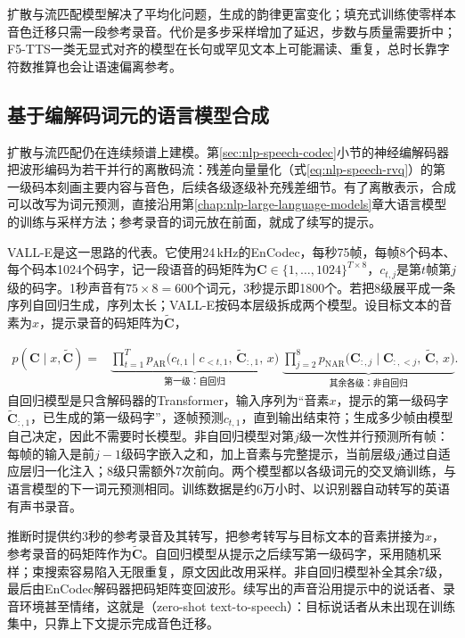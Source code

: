 扩散与流匹配模型解决了平均化问题，生成的韵律更富变化；填充式训练使零样本音色迁移只需一段参考录音。代价是多步采样增加了延迟，步数与质量需要折中；F5-TTS一类无显式对齐的模型在长句或罕见文本上可能漏读、重复，总时长靠字符数推算也会让语速偏离参考。

\subsection{基于编解码词元的语言模型合成}
\label{sec:nlp-speech-codec-lm-tts}

扩散与流匹配仍在连续频谱上建模。第\ref{sec:nlp-speech-codec}小节的神经编解码器把波形编码为若干并行的离散码流：残差向量量化（式\eqref{eq:nlp-speech-rvq}）的第一级码本刻画主要内容与音色，后续各级逐级补充残差细节。有了离散表示，合成可以改写为词元预测，直接沿用第\ref{chap:nlp-large-language-models}章大语言模型的训练与采样方法；参考录音的词元放在前面，就成了续写的提示。

VALL-E是这一思路的代表。它使用24\,kHz的EnCodec，每秒75帧，每帧8个码本、每个码本1024个码字，记一段语音的码矩阵为$\bm{C}\in\{1,\ldots,1024\}^{T\times8}$，$c_{t,j}$是第$t$帧第$j$级的码字。1秒声音有$75\times8=600$个词元，3秒提示即1800个。若把8级展平成一条序列自回归生成，序列太长；VALL-E按码本层级拆成两个模型。设目标文本的音素为$x$，提示录音的码矩阵为$\tilde{\bm{C}}$，

\begin{equation}
\begin{aligned}
  p(\bm{C}\mid x,\tilde{\bm{C}})
  ={}&\underbrace{\prod_{t=1}^{T}p_{\mathrm{AR}}\bigl(c_{t,1}\mid c_{<t,1},\,\tilde{\bm{C}}_{:,1},\,x\bigr)}_{\text{第一级：自回归}}
  \;\underbrace{\prod_{j=2}^{8}p_{\mathrm{NAR}}\bigl(\bm{C}_{:,j}\mid\bm{C}_{:,<j},\,\tilde{\bm{C}},\,x\bigr)}_{\text{其余各级：非自回归}} .
\end{aligned}
\label{eq:nlp-speech-valle}
\end{equation}
自回归模型是只含解码器的Transformer，输入序列为“音素$x$，提示的第一级码字$\tilde{\bm{C}}_{:,1}$，已生成的第一级码字”，逐帧预测$c_{t,1}$，直到输出结束符；生成多少帧由模型自己决定，因此不需要时长模型。非自回归模型对第$j$级一次性并行预测所有帧：每帧的输入是前$j-1$级码字嵌入之和，加上音素与完整提示，当前层级$j$通过自适应层归一化注入；8级只需额外7次前向。两个模型都以各级词元的交叉熵训练，与语言模型的下一词元预测相同。训练数据是约6万小时、以识别器自动转写的英语有声书录音。

推断时提供约3秒的参考录音及其转写，把参考转写与目标文本的音素拼接为$x$，参考录音的码矩阵作为$\tilde{\bm{C}}$。自回归模型从提示之后续写第一级码字，采用随机采样；束搜索容易陷入无限重复，原文因此改用采样。非自回归模型补全其余7级，最后由EnCodec解码器把码矩阵变回波形。续写出的声音沿用提示中的说话者、录音环境甚至情绪，这就是（zero-shot text-to-speech）：目标说话者从未出现在训练集中，只靠上下文提示完成音色迁移。

